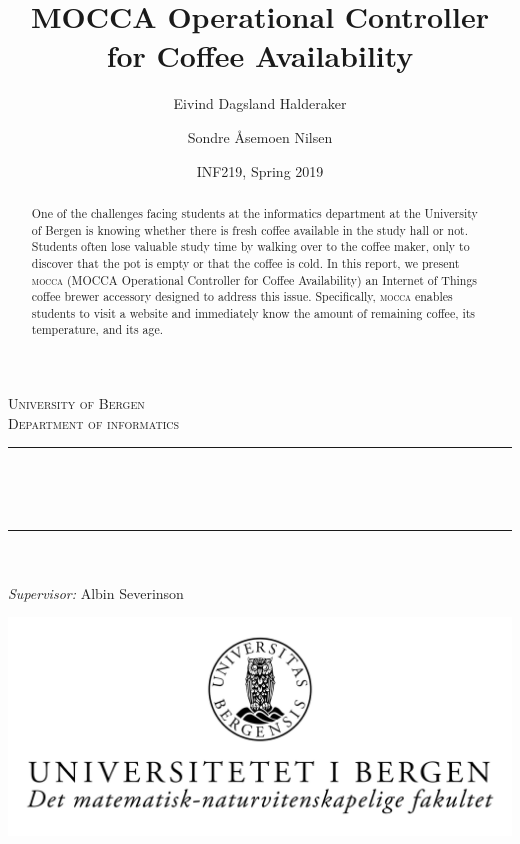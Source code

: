 \documentclass[12pt,a4paper,oneside,article]{memoir}
\title{MOCCA Operational Controller for Coffee Availability}
\author{Eivind Dagsland Halderaker \and Sondre Åsemoen Nilsen}
\date{INF219, Spring 2019}
\numberwithin{equation}{chapter}
\begin{document}
\begin{titlingpage}

\newcommand{\HRule}{\rule{\linewidth}{0.5mm}}
\centering

\textsc{\LARGE University of Bergen \\ Department of informatics}\\[1.5cm] %

\HRule\\[0.5cm]
\begin{Huge}
	\bfseries{\thetitle}\\[0.7cm]
\end{Huge}
\HRule\\[0.5cm]

{\large \theauthor}\\
{\large \emph{Supervisor:} Albin Severinson\\[2cm]}

\centerline{\includegraphics[scale=1.9]{figures/canvasWithFaculty}}
{\large \thedate}\\[3cm]
\vfill

\begin{abstract}
  One of the challenges facing students at the informatics department at the
  University of Bergen is knowing whether there is fresh coffee available in the
  study hall or not. Students often lose valuable study time by walking over to
  the coffee maker, only to discover that the pot is empty or that the coffee is
  cold. In this report, we present \textsc{mocca} (MOCCA Operational Controller
  for Coffee Availability) an Internet of Things coffee brewer accessory
  designed to address this issue. Specifically, \textsc{mocca} enables students
  to visit a website and immediately know the amount of remaining coffee, its
  temperature, and its age.
\end{abstract}
\end{titlingpage}

\clearpage
\end{document}
